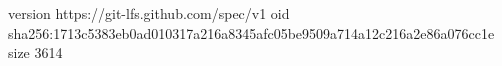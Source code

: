 version https://git-lfs.github.com/spec/v1
oid sha256:1713c5383eb0ad010317a216a8345afc05be9509a714a12c216a2e86a076cc1e
size 3614
